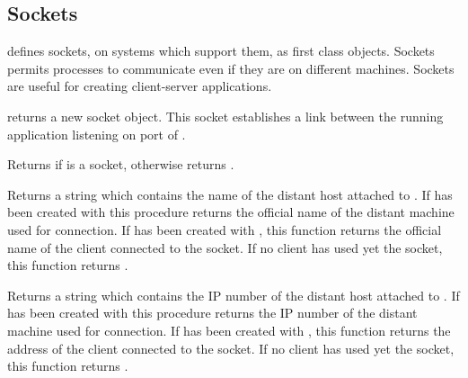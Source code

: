 %
%
%



\subsection{Sockets}

\label{socket-type}
{\stk} defines sockets, on systems which support them, as first class
objects. Sockets permits processes to communicate even if they are on
different machines. Sockets are useful for creating client-server
applications.

\begin{entry}{
}
\saut
{} returns a new socket object. This socket
establishes a link between the running application listening on port
 of .
\end{entry}

\begin{entry}{
}
\saut
Returns \schtrue{} if  is a socket, otherwise returns
{\schfalse}.
\end{entry}

\begin{entry}{
}
\saut
Returns a string which contains the name of the distant host attached to  
. If  has been created with 
this procedure returns the official name of the distant machine used for 
connection. If  has been created with ,
this function returns the official name of the client connected to the socket. 
If no client has used yet the socket, this function returns \schfalse.
\end{entry}

\begin{entry}{
}
\saut
Returns a string which contains the IP number of
the distant host attached to . If  has been
created with  this procedure returns the
IP number of the distant machine used for connection. If
 has been created with , this
function returns the address of the client connected to the
socket.  If no client has used yet the socket, this function returns
\schfalse.
\end{entry}

